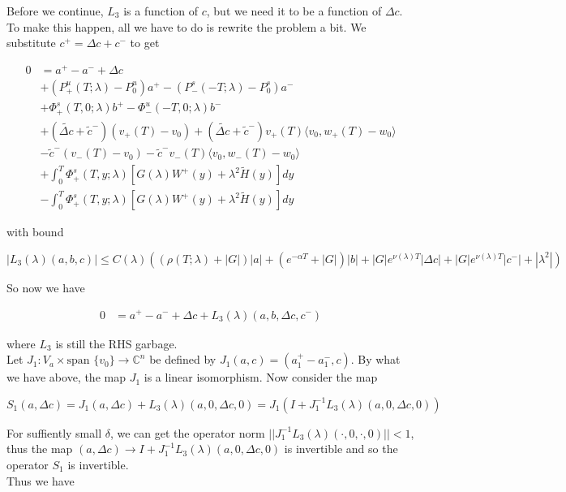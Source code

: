 \documentclass[12pt]{article}
\def\C{{\mathbb C}}
\begin{document}
\begin{enumerate}
Before we continue, $L_3$ is a function of $c$, but we need it to be a function of $\Delta c$. To make this happen, all we have to do is rewrite the problem a bit. We substitute $c^+ = \Delta c + c^-$ to get

\begin{align*}
0 &= a^+ - a^- + \Delta c \\
&+ (P^u_+(T; \lambda) - P_0^u)a^+ - (P^s_-(-T; \lambda) - P_0^s)a^- \\
&+ \Phi^s_+(T, 0; \lambda)b^+ - \Phi^u_-(-T, 0; \lambda)b^- \\
&+ (\tilde{\Delta c} + \tilde{c}^-)( v_+(T) - v_0) + (\tilde{\Delta c} + \tilde{c}^-) v_+(T) \langle v_0, w_+(T) - w_0 \rangle \\
&- \tilde{c}^-( v_-(T) - v_0) - \tilde{c}^- v_-(T) \langle v_0, w_-(T) - w_0 \rangle \\
&+ \int_0^T \Phi^s_+(T, y; \lambda) [ G(\lambda)W^+(y) + \lambda^2 \tilde{H}(y) ] dy \\
&- \int_0^T \Phi^s_+(T, y; \lambda) [ G(\lambda)W^+(y) + \lambda^2 \tilde{H}(y) ] dy
\end{align*}

with bound

\[
|L_3(\lambda)(a, b, c)| \leq C(\lambda) ( (\rho(T; \lambda) + |G| ) |a|
+ (e^{-\alpha T} + |G|) |b| + |G|e^{\nu(\lambda)T}|\Delta c| + |G|e^{\nu(\lambda)T}|c^-| + |\lambda^2| )
\]

So now we have 

\begin{align*}
0 &= a^+ - a^- + \Delta c + L_3(\lambda)(a, b, \Delta c, c^-)
\end{align*}

where $L_3$ is still the RHS garbage.\\

Let $J_1: V_a \times \text{span }\{v_0\} \rightarrow \C^n$ be defined by $J_1(a, c) = (a_1^+ - a_1^-, c)$. By what we have above, the map $J_1$ is a linear isomorphism. Now consider the map

\[
S_1(a, \Delta c) = J_1 (a, \Delta c) + L_3(\lambda)(a, 0, \Delta c, 0) = J_1( I + J_1^{-1} L_3(\lambda)(a, 0, \Delta c, 0) )
\]


For suffiently small $\delta$, we can get the operator norm $||J_1^{-1} L_3(\lambda)(\cdot, 0, \cdot, 0)|| < 1$, thus the map $(a, \Delta c) \rightarrow I + J_1^{-1} L_3(\lambda)(a, 0, \Delta c, 0)$ is invertible and so the operator $S_1$ is invertible.\\

Thus we have


\end{enumerate}
\end{document}

